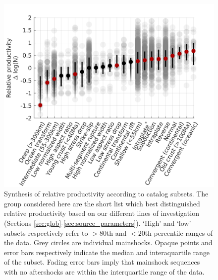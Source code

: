 \documentclass[draft, jgrga]{agujournal2018}
\begin{document}
 \begin{figure}
        \centering
        \includegraphics{figures/cal_tech.png}
        \caption{Synthesis of relative productivity according to catalog subsets. The group considered here are the short list which best distinguished relative productivity based on our different lines of investigation (Sections \ref{sec:glob}-\ref{sec:source_parameters}). `High' and `low' subsets respectively refer to $>80$th and $<20$th percentile ranges of the data. Grey circles are individual mainshocks. Opaque points and error bars respectively indicate the median and interaquartile range of the subset. Fading error bars imply that mainshock sequences with no aftershocks are within the interquartile range of the data. }
        \label{fig:caltech}
    \end{figure}   
    
\end{document}

